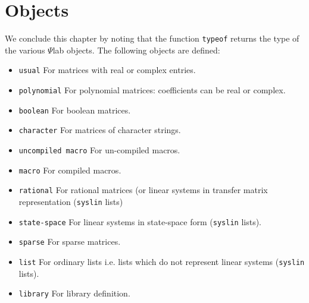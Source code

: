 \section{Objects}
We conclude this chapter by noting that the function {\tt typeof}
returns the type of the various $\Psi$lab objects. The following objects
are defined:
\begin{itemize}
\item{\tt usual} For matrices with real or complex entries.
\item{\tt polynomial} For polynomial matrices: coefficients can be 
real or complex.
\item{\tt boolean} For boolean matrices.
\item{\tt character} For matrices of character strings.
\item{\tt uncompiled macro} For un-compiled macros.
\item{\tt macro} For compiled macros.
\item{\tt rational} For rational matrices (or linear systems in
transfer matrix representation ({\tt syslin} lists)
\item{\tt state-space} For linear systems in state-space 
form ({\tt syslin} lists).
\item{\tt sparse} For sparse matrices.
\item{\tt list} For ordinary lists i.e. lists which do not represent
linear systems ({\tt syslin} lists).
\item{\tt library} For library definition.
\end{itemize}